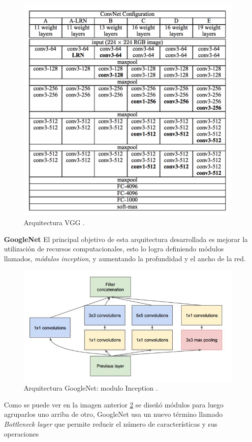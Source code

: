 \begin{figure}[H]
 \centering
  \includegraphics[scale=0.6,keepaspectratio=true,clip=true]{imagenes/MarcoTeorico/vgg.png}
  \caption{Arquitectura VGG \citep{vgg}.}
	\label{Fig:vgg}
\end{figure}

\par \textbf{GoogleNet} \citep{googlenet} El principal objetivo de esta arquitectura desarrollada es mejorar la utilización de recursos computacionales, esto lo logra definiendo módulos llamados, \textit{módulos inception}, y aumentando la profundidad y el ancho de la red. 
\begin{figure}[H]
 \centering
  \includegraphics[scale=0.5,keepaspectratio=true,clip=true]{imagenes/MarcoTeorico/inception-1.jpg}
  \caption{Arquitectura GoogleNet: modulo Inception \citep{googlenet}.}
  	\label{Fig:inception}
\end{figure}
Como se puede ver en la imagen anterior \ref{Fig:inception} se diseñó módulos para luego agruparlos uno arriba de otro, GoogleNet usa un nuevo término llamado \textit{Bottleneck layer} que permite reducir el número de características y sus operaciones 

